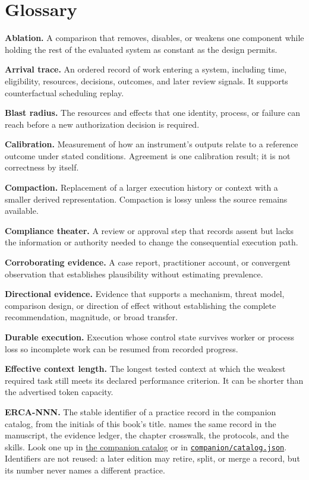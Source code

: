 \chapter*{Glossary}
\textbf{Ablation.} A comparison that removes, disables, or weakens one component while holding the rest of the evaluated system as constant as the design permits.

\textbf{Arrival trace.} An ordered record of work entering a system, including time, eligibility, resources, decisions, outcomes, and later review signals. It supports counterfactual scheduling replay.

\textbf{Blast radius.} The resources and effects that one identity, process, or failure can reach before a new authorization decision is required.

\textbf{Calibration.} Measurement of how an instrument's outputs relate to a reference outcome under stated conditions. Agreement is one calibration result; it is not correctness by itself.

\textbf{Compaction.} Replacement of a larger execution history or context with a smaller derived representation. Compaction is lossy unless the source remains available.

\textbf{Compliance theater.} A review or approval step that records assent but lacks the information or authority needed to change the consequential execution path.

\textbf{Corroborating evidence.} A case report, practitioner account, or convergent observation that establishes plausibility without estimating prevalence.

\textbf{Directional evidence.} Evidence that supports a mechanism, threat model, comparison design, or direction of effect without establishing the complete recommendation, magnitude, or broad transfer.

\textbf{Durable execution.} Execution whose control state survives worker or process loss so incomplete work can be resumed from recorded progress.

\textbf{Effective context length.} The longest tested context at which the weakest required task still meets its declared performance criterion. It can be shorter than the advertised token capacity.

\textbf{ERCA-NNN.} The stable identifier of a practice record in the companion catalog, from the initials of this book's title. \texttt{} names the same record in the manuscript, the evidence ledger, the chapter crosswalk, the protocols, and the skills. Look one up in \href{https://sjarmak.ai/books/engineering-reliable-coding-agents/companion}{the companion catalog} or in \href{https://github.com/sjarmak/engineering-reliable-coding-agents/blob/main/companion/catalog.json}{\texttt{companion/catalog.json}}. Identifiers are not reused: a later edition may retire, split, or merge a record, but its number never names a different practice.

